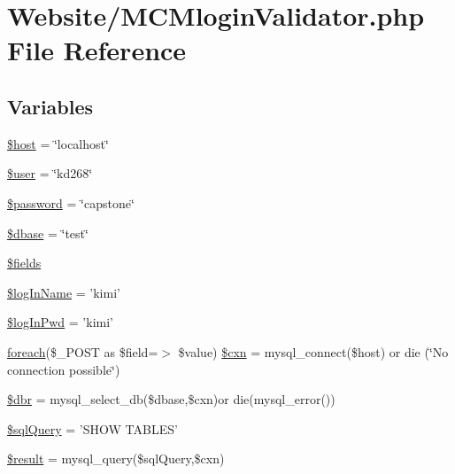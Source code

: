 \hypertarget{_m_c_mlogin_validator_8php}{\section{Website/\-M\-C\-Mlogin\-Validator.php File Reference}
\label{_m_c_mlogin_validator_8php}
}
\subsection*{Variables}
\begin{DoxyCompactItemize}
\item 
\hyperlink{_m_c_mlogin_validator_8php_a711797613cb863ca0756df789c396bf2}{\$host} = \char`\"{}localhost\char`\"{}
\item 
\hyperlink{_m_c_mlogin_validator_8php_a598ca4e71b15a1313ec95f0df1027ca5}{\$user} = \char`\"{}kd268\char`\"{}
\item 
\hyperlink{_m_c_mlogin_validator_8php_a607686ef9f99ea7c42f4f3dd3dbb2b0d}{\$password} = \char`\"{}capstone\char`\"{}
\item 
\hyperlink{_m_c_mlogin_validator_8php_abd981912075cb8356ca370b4fefdfed7}{\$dbase} = \char`\"{}test\char`\"{}
\item 
\hyperlink{_m_c_mlogin_validator_8php_ab2303c817e3b402b77b7f99627b9c319}{\$fields}
\item 
\hyperlink{_m_c_mlogin_validator_8php_a30b110afa9d5bd2d01ba8f74a46d2b3f}{\$log\-In\-Name} = 'kimi'
\item 
\hyperlink{_m_c_mlogin_validator_8php_a1c091e7fa854daecefe6889e0cb8975e}{\$log\-In\-Pwd} = 'kimi'
\item 
\hyperlink{_m_c_mlogin_8php_a58d12ec81e33be9b80508ee874adb2c1}{foreach}(\$\-\_\-\-P\-O\-S\-T as \$field=$>$ \$value) \hyperlink{_m_c_mlogin_validator_8php_a67bdfa000f51c8afb4135092c68cf1d7}{\$cxn} = mysql\-\_\-connect(\$host) or die (\char`\"{}No connection possible\char`\"{})
\item 
\hyperlink{_m_c_mlogin_validator_8php_a88fea670240e5fa6ae306a286acaa0fd}{\$dbr} = mysql\-\_\-select\-\_\-db(\$dbase,\$cxn)or die(mysql\-\_\-error())
\item 
\hyperlink{_m_c_mlogin_validator_8php_a08f961a26ebf8ad5411239bba701a67c}{\$sql\-Query} = 'S\-H\-O\-W T\-A\-B\-L\-E\-S'
\item 
\hyperlink{_m_c_mlogin_validator_8php_a112ef069ddc0454086e3d1e6d8d55d07}{\$result} = mysql\-\_\-query(\$sql\-Query,\$cxn)
\item 

\end{DoxyCompactItemize}
